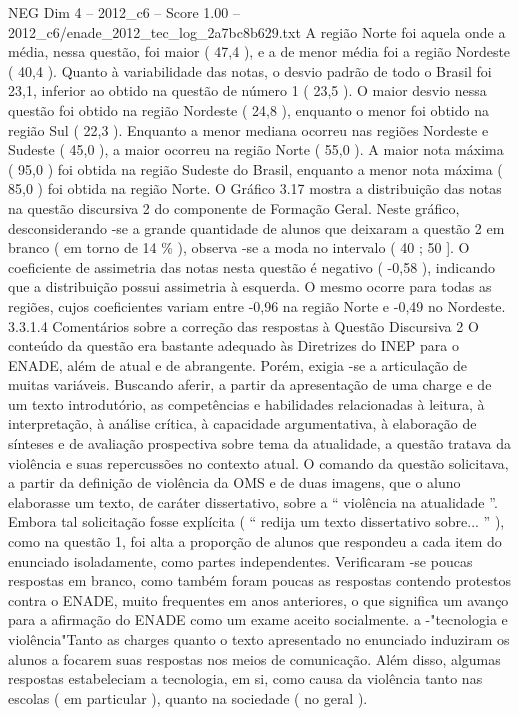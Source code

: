 \begin{textsample}{NEG Dim 4 – 2012\_c6 – Score 1.00 – 2012\_c6/enade\_2012\_tec\_log\_2a7bc8b629.txt}
A região Norte foi aquela onde a média, nessa questão, foi maior ( 47,4 ), e a de menor média foi a região Nordeste ( 40,4 ).
Quanto à variabilidade das notas, o desvio padrão de todo o Brasil foi 23,1, inferior ao obtido na questão de número 1 ( 23,5 ).
O maior desvio nessa questão foi obtido na região Nordeste ( 24,8 ), enquanto o menor foi obtido na região Sul ( 22,3 ).
Enquanto a menor mediana ocorreu nas regiões Nordeste e Sudeste ( 45,0 ), a maior ocorreu na região Norte ( 55,0 ).
A maior nota máxima ( 95,0 ) foi obtida na região Sudeste do Brasil, enquanto a menor nota máxima ( 85,0 ) foi obtida na região Norte.
O Gráfico 3.17 mostra a distribuição das notas na questão discursiva 2 do componente de Formação Geral.
Neste gráfico, desconsiderando -se a grande quantidade de alunos que deixaram a questão 2 em branco ( em torno de 14 \% ), observa -se a moda no intervalo ( 40 ; 50 ].
O coeficiente de assimetria das notas nesta questão é negativo ( -0,58 ), indicando que a distribuição possui assimetria à esquerda.
O mesmo ocorre para todas as regiões, cujos coeficientes variam entre -0,96 na região Norte e -0,49 no Nordeste. 3.3.1.4 Comentários sobre a correção das respostas à Questão Discursiva 2 O conteúdo da questão era bastante adequado às Diretrizes do INEP para o ENADE, além de atual e de abrangente.
Porém, exigia -se a articulação de muitas variáveis.
Buscando aferir, a partir da apresentação de uma charge e de um texto introdutório, as competências e habilidades relacionadas à leitura, à interpretação, à análise crítica, à capacidade argumentativa, à elaboração de sínteses e de avaliação prospectiva sobre tema da atualidade, a questão tratava da violência e suas repercussões no contexto atual.
O comando da questão solicitava, a partir da definição de violência da OMS e de duas imagens, que o aluno elaborasse um texto, de caráter dissertativo, sobre a “ violência na atualidade ”.
Embora tal solicitação fosse explícita ( “ redija um texto dissertativo sobre... ” ), como na questão 1, foi alta a proporção de alunos que respondeu a cada item do enunciado isoladamente, como partes independentes.
Verificaram -se poucas respostas em branco, como também foram poucas as respostas contendo protestos contra o ENADE, muito frequentes em anos anteriores, o que significa um avanço para a afirmação do ENADE como um exame aceito socialmente. a -"tecnologia e violência"Tanto as charges quanto o texto apresentado no enunciado induziram os alunos a focarem suas respostas nos meios de comunicação.
Além disso, algumas respostas estabeleciam a tecnologia, em si, como causa da violência tanto nas escolas ( em particular ), quanto na sociedade ( no geral ).

\end{textsample}
